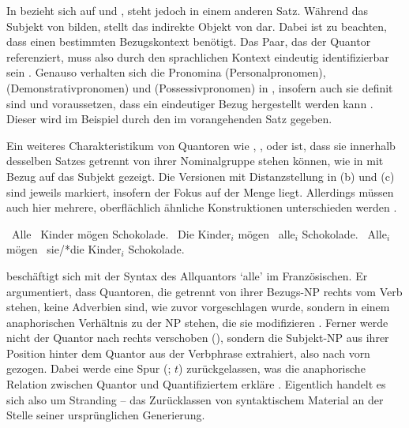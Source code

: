 In  bezieht sich  auf  und ,
steht jedoch in einem anderen Satz. Während  das Subjekt
von  bilden, stellt  das indirekte Objekt von
 dar. Dabei ist zu beachten, dass  einen bestimmten
Bezugskontext benötigt. Das Paar, das der Quantor referenziert, muss also durch
den sprachlichen Kontext eindeutig identifizierbar sein
\autocites[vgl.~z.\,B.][274]{lyons1999}[788]{schwartz2000}[983]{janssen2004}.
Genauso verhalten sich die Pronomina  (Personalpronomen), 
(Demonstrativpronomen) und  (Possessivpronomen) in
, insofern auch sie definit sind und voraussetzen, dass
ein eindeutiger Bezug hergestellt werden kann
\autocites[vgl.][145--148]{lyons1999}. Dieser wird im Beispiel durch den
 im vorangehenden Satz gegeben.

Ein weiteres Charakteristikum von Quantoren wie ,
,  oder  ist, dass sie innerhalb desselben
Satzes getrennt von ihrer Nominalgruppe stehen können, wie in
 mit Bezug auf das Subjekt gezeigt. Die Versionen mit
Distanzstellung in (b) und (c) sind jeweils markiert, insofern der Fokus auf
der Menge liegt. Allerdings müssen auch hier mehrere, oberflächlich ähnliche
Konstruktionen unterschieden werden
\autocites[27--28]{pittner1995}[65--67]{fanselowcavar2002}.

\begin{exe}
\ex \label{ex:floatsubj}
\begin{xlist}
	\ex \label{ex:floatsubj_1}
		{\ob}~Alle {\ob}~Kinder{\cb}{\cb} mögen Schokolade.
	\ex \label{ex:floatsubj_2}
		{\ob}~Die Kinder{\cb}$_i$ mögen {\ob}~alle{\cb}$_i$
		Schokolade.
	\ex \label{ex:floatsubj_3}
		{\ob}~Alle{\cb}$_i$ mögen {\ob}~sie/*die
		Kinder{\cb}$_i$ Schokolade.
\end{xlist}
\end{exe}

\citet{sportiche1988} beschäftigt sich mit der Syntax des Allquantors 
`alle' im Französischen. Er argumentiert, dass Quantoren, die
getrennt von ihrer Bezugs-NP rechts vom Verb stehen, keine Adverbien sind, wie
zuvor vorgeschlagen wurde, sondern in einem anaphorischen Verhältnis zu der NP
stehen, die sie modifizieren \autocite[428--433]{sportiche1988}. Ferner werde
nicht der Quantor nach rechts verschoben (), sondern die
Subjekt-NP aus ihrer Position hinter dem Quantor aus der Verbphrase extrahiert,
also nach vorn gezogen. Dabei werde eine Spur (; $t$) zurückgelassen,
was die anaphorische Relation zwischen Quantor und Quantifiziertem erkläre
\autocite[432--433]{sportiche1988}. Eigentlich handelt es sich also um
Stranding -- das Zurücklassen von syntaktischem Material an der Stelle seiner
ursprünglichen Generierung.

